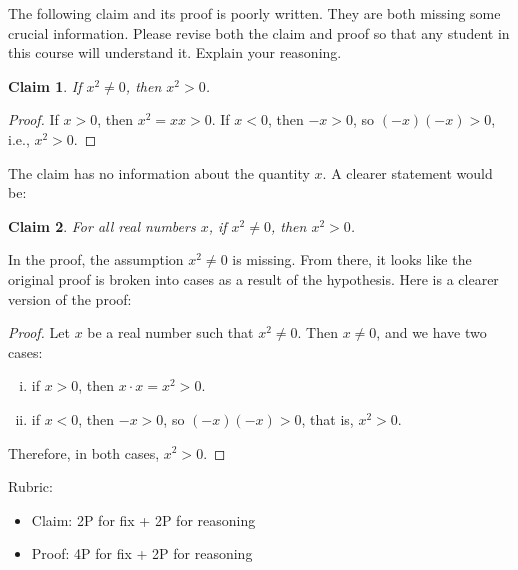 \documentclass{article}
\newtheorem*{claim}{Claim}
\theoremstyle{definition}
\begin{document}
\begin{question}
   The following claim and its proof is poorly written. They are both missing some crucial information. 
   Please revise both the claim and proof so that any student in this course will understand it. Explain your reasoning.
      \begin{claim}
       If $x^2\neq 0$, then $x^2>0$.
      \end{claim}
      \begin{proof}
       If $x>0$, then $x^2=xx>0$. If $x<0$, then $-x>0$, so $(-x)(-x)>0$, i.e., $x^2>0$.
      \end{proof}
\end{question}
\begin{solution}
    The claim has no information about the quantity $x$. A clearer statement would be:
        \begin{claim}
           For all real numbers $x$, if $x^2\neq 0$, then $x^2>0$.
        \end{claim}
    In the proof, the assumption $x^2\neq 0$ is missing. 
    From there, it looks like the original proof is broken into cases as a result of the hypothesis. 
    Here is a clearer version of the proof:
        \begin{proof}
           Let $x$ be a real number such that $x^2\neq 0$. Then $x\neq 0$, and we have two cases:
            \begin{enumerate}[i.]
                 \item if $x>0$, then $x\cdot x=x^2>0$.
                 \item if $x<0$, then $-x>0$, so $(-x)(-x)>0$, that is, $x^2>0$.
            \end{enumerate}
           Therefore, in both cases, $x^2>0$.
        \end{proof}

{\color{red} Rubric:
\begin{itemize}
\item Claim: 2P for fix + 2P for reasoning
\item Proof: 4P for fix + 2P for reasoning
\end{itemize}}
\end{solution}
\end{document}

